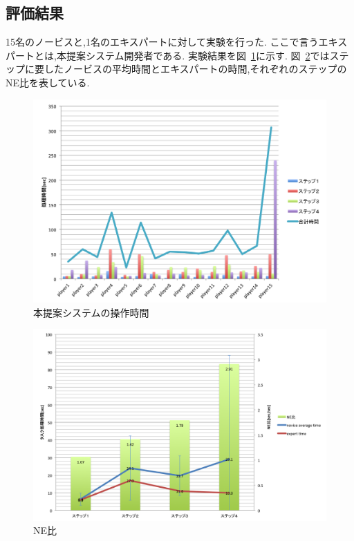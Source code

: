 \documentclass[sotsuron]{kuee}
\begin{document}
		\subsection{評価結果}
			15名のノービスと,1名のエキスパートに対して実験を行った.
			ここで言うエキスパートとは,本提案システム開発者である.
			実験結果を図~\ref{fig:result01}に示す.
			図~\ref{fig:result02}ではステップに要したノービスの平均時間とエキスパートの時間,それぞれのステップのNE比を表している.
			\begin{figure}
				\begin{center}
					\includegraphics[width=\linewidth]{./png/result01.png}
				\end{center}
				\caption{本提案システムの操作時間}
		  		\label{fig:result01}
			\end{figure}
			\begin{figure}
				\begin{center}
					\includegraphics[width=\linewidth]{./png/result02.png}
				\end{center}
				\caption{NE比}
		  		\label{fig:result02}
			\end{figure}
\end{document}
